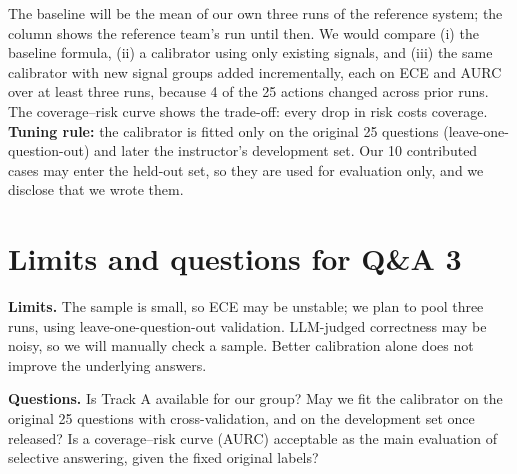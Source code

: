 \documentclass[9pt,a4paper]{extarticle}
\begin{document}
The baseline will be the mean of our own three runs of the reference system; the column shows the reference team's run until then. We would compare (i) the baseline formula, (ii) a calibrator using only existing signals, and (iii) the same calibrator with new signal groups added incrementally, each on ECE and AURC over at least three runs, because 4 of the 25 actions changed across prior runs. The coverage--risk curve shows the trade-off: every drop in risk costs coverage. \textbf{Tuning rule:} the calibrator is fitted only on the original 25 questions (leave-one-question-out) and later the instructor's development set. Our 10 contributed cases may enter the held-out set, so they are used for evaluation only, and we disclose that we wrote them.

\section*{Limits and questions for Q\&A 3}
\textbf{Limits.} The sample is small, so ECE may be unstable; we plan to pool three runs, using leave-one-question-out validation. LLM-judged correctness may be noisy, so we will manually check a sample. Better calibration alone does not improve the underlying answers.

\textbf{Questions.} Is Track A available for our group? May we fit the calibrator on the original 25 questions with cross-validation, and on the development set once released? Is a coverage--risk curve (AURC) acceptable as the main evaluation of selective answering, given the fixed original labels?
\end{document}

